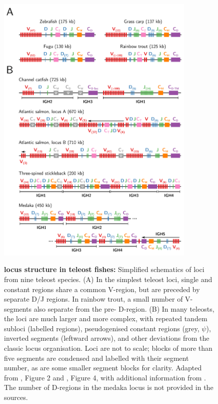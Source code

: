 \begin{figure}
\centering
\includegraphics[width=0.85\textwidth]{_Figures/png_edited/teleost-loci}
\begin{subfigure}{0em}
\label{fig:intro-teleost-loci-simple}
\end{subfigure}
\begin{subfigure}{0em}
\label{fig:intro-teleost-loci-complex}
\end{subfigure}
\caption[\igh{} locus structure in teleost fishes]{\textbf{\igh{} locus structure in teleost fishes:} Simplified schematics of \igh{} loci from nine teleost species. (A) In the simplest teleost \igh{} loci, single  and  constant regions share a common V-region, but are preceded by separate D/J regions. In rainbow trout, a small number of V-segments also separate  from the pre- D-region. (B) In many teleosts, the \igh{} loci are much larger and more complex, with repeated tandem subloci (labelled regions), pseudogenised constant regions (grey, $\psi$), inverted segments (leftward arrows), and other deviations from the classic locus organisation. Loci are not to scale; blocks of more than five segments are condensed and labelled with their segment number, as are some smaller segment blocks for clarity. Adapted from \parencite{fillatreau2013astonishing}, Figure 2 and \parencite{bengten2015fishantibodies}, Figure 4, with additional information from \parencite{magadan2011medaka,bao2010stickleback,gambondeza2011stickleback,yasuike2010salmon,xiao2010grasscarp}.
The number of D-regions in the medaka locus is not provided in the sources.}
\label{fig:intro-teleost-loci}
\end{figure}

